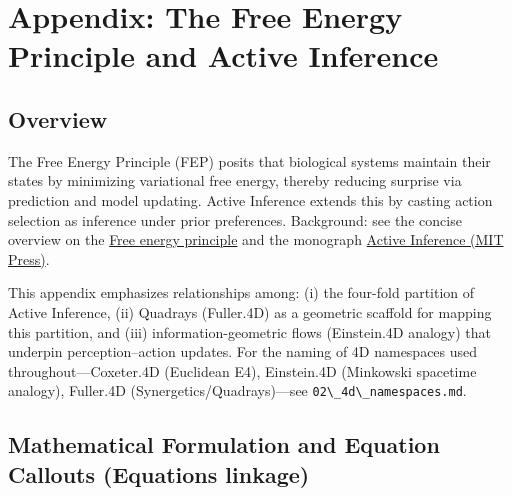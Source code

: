 \documentclass[
  10pt,
]{article}
\newcommand{\passthrough}[1]{#1}
\begin{document}
\hypertarget{appendix-the-free-energy-principle-and-active-inference}{%
\section{Appendix: The Free Energy Principle and Active
Inference}\label{appendix-the-free-energy-principle-and-active-inference}}

\hypertarget{overview-2}{%
\subsection{Overview}\label{overview-2}}

The Free Energy Principle (FEP) posits that biological systems maintain
their states by minimizing variational free energy, thereby reducing
surprise via prediction and model updating. Active Inference extends
this by casting action selection as inference under prior preferences.
Background: see the concise overview on the
\href{https://en.wikipedia.org/wiki/Free_energy_principle}{Free energy
principle} and the monograph
\href{https://direct.mit.edu/books/oa-monograph/5299/Active-InferenceThe-Free-Energy-Principle-in-Mind}{Active
Inference (MIT Press)}.

This appendix emphasizes relationships among: (i) the four-fold
partition of Active Inference, (ii) Quadrays (Fuller.4D) as a geometric
scaffold for mapping this partition, and (iii) information-geometric
flows (Einstein.4D analogy) that underpin perception--action updates.
For the naming of 4D namespaces used throughout---Coxeter.4D (Euclidean
E4), Einstein.4D (Minkowski spacetime analogy), Fuller.4D
(Synergetics/Quadrays)---see
\passthrough{\lstinline!02\_4d\_namespaces.md!}.

\hypertarget{mathematical-formulation-and-equation-callouts-equations-linkage}{%
\subsection{Mathematical Formulation and Equation Callouts (Equations
linkage)}\label{mathematical-formulation-and-equation-callouts-equations-linkage}}
\end{document}
